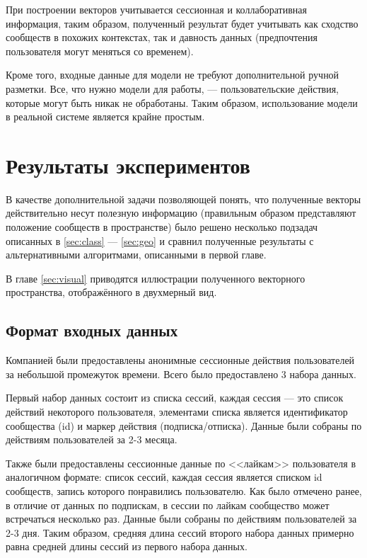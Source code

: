 \documentclass[times,specification,annotation]{itmo-student-thesis}
\begin{document}
При построении векторов учитывается сессионная и
коллаборативная информация, таким образом, полученный результат будет
учитывать как сходство сообществ в похожих контекстах, так и давность данных
(предпочтения пользователя могут меняться со временем). 

Кроме того, входные данные для модели не требуют дополнительной ручной разметки. Все, что нужно модели для работы, --- пользовательские действия, которые могут быть никак не обработаны. Таким образом, использование модели в реальной системе является крайне простым.

\chapter{Результаты экспериментов}

В качестве дополнительной задачи позволяющей понять, что полученные
векторы действительно несут полезную информацию (правильным образом
представляют положение сообществ в пространстве) было решено несколько подзадач
описанных в \ref{sec:class} --- \ref{sec:geo} и сравнил полученные результаты с альтернативными
алгоритмами, описанными в первой главе. 

В главе \ref{sec:visual} приводятся иллюстрации полученного векторного пространства, отображённого в двухмерный вид.

\section{Формат входных данных}\label{sec:data-format}

Компанией были предоставлены анонимные сессионные действия пользователей за небольшой промежуток времени. Всего было предоставлено 3 набора данных.

Первый набор данных состоит из списка сессий, каждая сессия --- это список действий некоторого пользователя, элементами списка является идентификатор сообщества (id) и маркер действия (подписка/отписка). Данные были собраны по действиям пользователей за 2-3 месяца.

Также были предоставлены сессионные данные по <<лайкам>> пользователя в аналогичном формате: список сессий, каждая сессия является списком id сообществ, запись которого понравились пользователю. Как было отмечено ранее, в отличие от данных по подпискам, в сессии по лайкам сообщество может встречаться несколько раз. Данные были собраны по действиям пользователей за 2-3 дня. Таким образом, средняя длина сессий второго набора данных примерно равна средней длины сессий из первого набора данных. 
\end{document}
